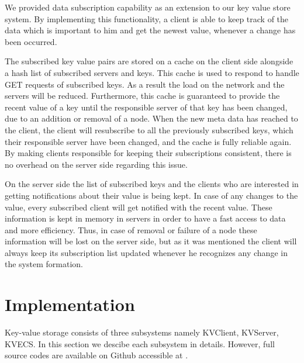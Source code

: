 \documentclass{sig-alternate}
\begin{document}
We provided data subscription capability as an extension to our key value store system. By implementing  this functionality, a client is able to keep track of the data which is important to him and get the newest value, whenever a change has been occurred. 

The subscribed key value pairs are stored on a cache on the client side alongside a hash list of subscribed servers and keys. This cache is used to respond to handle GET requests of subscribed keys. As a result the load on the network and the servers will be reduced. Furthermore, this cache is guaranteed to provide the recent value of a key until the responsible server of that key has been changed, due to an addition or removal of a node. When the new meta data has reached to the client, the client will resubscribe to all the previously subscribed keys, which their responsible server have been changed, and the cache is fully reliable again. By making clients responsible for keeping their subscriptions consistent, there is no overhead on the server side regarding this issue.

On the server side the list of subscribed keys and the clients who are interested in getting notifications about their value is being kept. In case of any changes to the value, every subscribed client will get notified with the recent value. These information is kept in memory in servers in order to have a fast access to data and more efficiency. Thus, in case of removal or failure of a node these information will be lost on the server side, but as it was mentioned the client will always keep its subscription list updated whenever he recognizes any change in the system formation.


\section{Implementation}\label{implementation}
Key-value storage consists of three subsystems namely KVClient, KVServer, KVECS. 
In this section we descibe each subsystem in details. However, full source codes are available on Github accessible at \cite{github}. 
\end{document}
